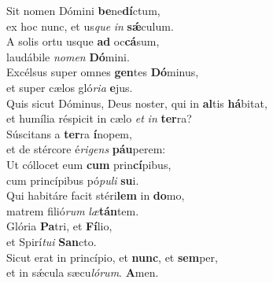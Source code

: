 \evenverse Sit nomen Dómini \textbf{be}ne\textbf{dí}ctum,~\*\\
\evenverse ex hoc nunc, et us\textit{que} \textit{in} \textbf{sǽ}culum.\\
\oddverse A solis ortu usque \textbf{ad} oc\textbf{cá}sum,~\*\\
\oddverse laudábile \textit{no}\textit{men} \textbf{Dó}mini.\\
\evenverse Excélsus super omnes \textbf{gen}tes \textbf{Dó}minus,~\*\\
\evenverse et super cælos gló\textit{ri}\textit{a} \textbf{e}jus.\\
\oddverse Quis sicut Dóminus, Deus noster, qui in \textbf{al}tis \textbf{há}bitat,~\*\\
\oddverse et humília réspicit in cælo \textit{et} \textit{in} \textbf{ter}ra?\\
\evenverse Súscitans a \textbf{ter}ra \textbf{í}nopem,~\*\\
\evenverse et de stércore é\textit{ri}\textit{gens} \textbf{páu}perem:\\
\oddverse Ut cóllocet eum \textbf{cum} prin\textbf{cí}pibus,~\*\\
\oddverse cum princípibus pó\textit{pu}\textit{li} \textbf{su}i.\\
\evenverse Qui habitáre facit stéri\textbf{lem} in \textbf{do}mo,~\*\\
\evenverse matrem filió\textit{rum} \textit{læ}\textbf{tán}tem.\\
\oddverse Glória \textbf{Pa}tri, et \textbf{Fí}lio,~\*\\
\oddverse et Spirí\textit{tu}\textit{i} \textbf{San}cto.\\
\evenverse Sicut erat in princípio, et \textbf{nunc}, et \textbf{sem}per,~\*\\
\evenverse et in sǽcula sæcu\textit{ló}\textit{rum}. \textbf{A}men.\\
